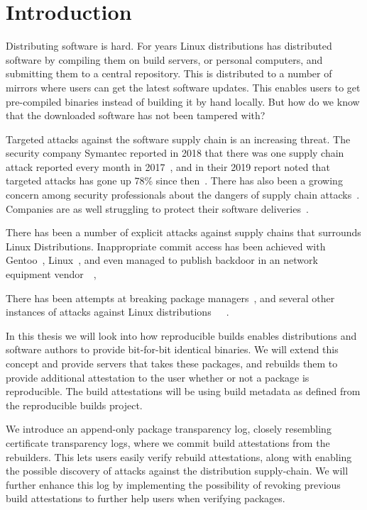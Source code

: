 \documentclass[../Main/thesis.tex]{subfiles}
\begin{document}
\chapter{Introduction}\label{ch:introduction}
Distributing software is hard. For years Linux distributions has distributed
software by compiling them on build servers, or personal computers, and
submitting them to a central repository. This is distributed to a number of
mirrors where users can get the latest software updates. This enables users to
get pre-compiled binaries instead of building it by hand locally. But how do we
know that the downloaded software has not been tampered with?

Targeted attacks against the software supply chain is an increasing threat.
The security company Symantec reported in 2018 that there was one supply chain
attack reported every month in 2017~\cite{symantec-istr-2018}, and in their 2019
report noted that targeted attacks has gone up 78\% since
then~\cite{symantec-istr-2019}. There has also been a growing concern among
security professionals about the dangers of supply chain
attacks~\cite{crowdstrike-supply-chain-attacks}. Companies are as well
struggling to protect their software deliveries~\cite{cd-pipelines-case-study}.

There has been a number of explicit attacks against supply chains that surrounds
Linux Distributions. Inappropriate commit access has been achieved with
Gentoo~\cite{gentoo-compromise-2018}, Linux~\cite{linux-compromise-2011}, and
even managed to publish backdoor in an network equipment
vendor~\cite{Checkoway:2016:SAJ:2976749.2978395}~\cite{juniper-backdoor-advisory},

There has been attempts at breaking package
managers~\cite{Cappos:2008:LMA:1455770.1455841}, and several other instances of
attacks against Linux
distributions~\cite{gentoo-compromise-2003}~\cite{fedora-compromise-2011}~\cite{fedora-compromise-2008}.

In this thesis we will look into how reproducible builds enables distributions
and software authors to provide bit-for-bit identical binaries. We will extend
this concept and provide servers that takes these packages, and rebuilds them to
provide additional attestation to the user whether or not a package is
reproducible. The build attestations will be using build metadata as defined
from the reproducible builds project.

We introduce an append-only package transparency log, closely resembling
certificate transparency logs, where we commit build attestations from the
rebuilders. This lets users easily verify rebuild attestations, along with
enabling the possible discovery of attacks against the distribution
supply-chain. We will further enhance this log by implementing the possibility
of revoking previous build attestations to further help users when verifying
packages.
\end{document}
